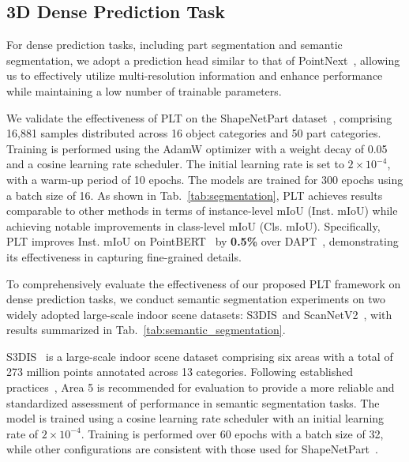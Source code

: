 



\subsection{3D Dense Prediction Task}
For dense prediction tasks, including part segmentation and semantic segmentation, we adopt a prediction head similar to that of PointNext~\cite{qian2022pointnext}, allowing us to effectively utilize multi-resolution information and enhance performance while maintaining a low number of trainable parameters.

We validate the effectiveness of PLT on the ShapeNetPart dataset~\cite{yi2016scalable}, comprising 16,881 samples distributed across 16 object categories and 50 part categories. Training is performed using the AdamW optimizer with a weight decay of 0.05 and a cosine learning rate scheduler. The initial learning rate is set to $2 \times 10^{-4}$, with a warm-up period of 10 epochs. The models are trained for 300 epochs using a batch size of 16. As shown in Tab.~\ref{tab:segmentation}, PLT achieves results comparable to other methods in terms of instance-level mIoU (Inst. mIoU) while achieving notable improvements in class-level mIoU (Cls. mIoU). Specifically, PLT improves Inst. mIoU on PointBERT~\cite{yu2022point} by \textbf{0.5\%} over DAPT~\cite{zhou2024dynamic}, demonstrating its effectiveness in capturing fine-grained details.



To comprehensively evaluate the effectiveness of our proposed PLT framework on dense prediction tasks, we conduct semantic segmentation experiments on two widely adopted large-scale indoor scene datasets: S3DIS~\cite{armeni20163d}and ScanNetV2~\cite{dai2017scannet}, with results summarized in Tab.~\ref{tab:semantic_segmentation}. 

S3DIS~\cite{armeni20163d} is a large-scale indoor scene dataset comprising six areas with a total of 273 million points annotated across 13 categories. Following established practices~\cite{dong2022autoencoders}, Area 5 is recommended for evaluation to provide a more reliable and standardized assessment of performance in semantic segmentation tasks. The model is trained using a cosine learning rate scheduler with an initial learning rate of $2 \times 10^{-4}$. Training is performed over 60 epochs with a batch size of 32, while other configurations are consistent with those used for ShapeNetPart~\cite{yi2016scalable}.

